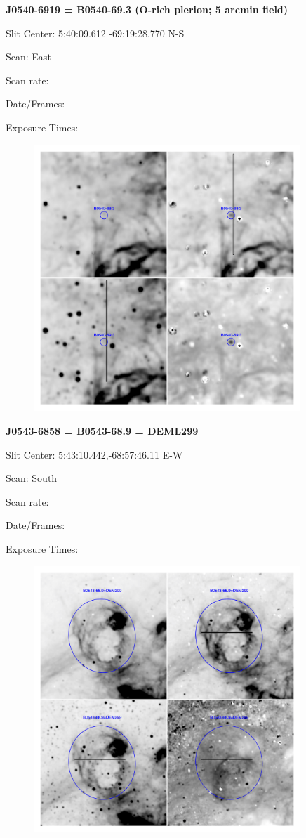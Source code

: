 \documentclass[11pt]{article}
\begin{document}
\newpage
{\bf J0540-6919 = B0540-69.3  (O-rich plerion; 5 arcmin field)}  
 
Slit Center:  5:40:09.612  -69:19:28.770 N-S

Scan:  East

Scan rate:  

Date/Frames:

Exposure Times:  

\begin{figure}
\includegraphics[width=10.05cm]{snapshots/B0540-693_5arcmin.png}
\end{figure}

\newpage
{\bf J0543-6858 = B0543-68.9 = DEML299}  
 
Slit Center:  5:43:10.442,-68:57:46.11 E-W

Scan:  South

Scan rate:  

Date/Frames:

Exposure Times:  

\begin{figure}
\includegraphics[width=10.05cm]{snapshots/B0543-689.png}
\end{figure}
\end{document}
